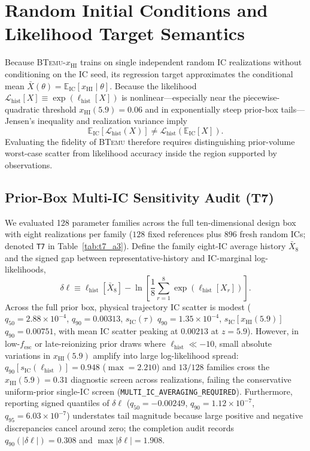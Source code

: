 \documentclass[aps,prd,reprint,superscriptaddress,nofootinbib,amsmath,amssymb,floatfix,longbibliography]{revtex4-2}
\begin{document}
\section{Random Initial Conditions and Likelihood Target Semantics}\label{sec:ic}

Because \textsc{BTemu}-$x_{\mathrm{HI}}$ trains on single independent random IC realizations without conditioning on the IC seed, its regression target approximates the conditional mean $\bar{X}(\theta) = \mathbb{E}_{\mathrm{IC}}[x_{\mathrm{HI}} \mid \theta]$. Because the likelihood $\mathcal{L}_{\mathrm{hist}}[X] \equiv \exp(\ell_{\mathrm{hist}}[X])$ is nonlinear---especially near the piecewise-quadratic threshold $x_{\mathrm{HI}}(5.9)=0.06$ and in exponentially steep prior-box tails---Jensen's inequality and realization variance imply
\begin{equation}
\mathbb{E}_{\mathrm{IC}}\!\left[\mathcal{L}_{\mathrm{hist}}(X)\right]
\neq \mathcal{L}_{\mathrm{hist}}\!\left(\mathbb{E}_{\mathrm{IC}}[X]\right).
\label{eq:jensen}
\end{equation}
Evaluating the fidelity of \textsc{BTemu} therefore requires distinguishing prior-volume worst-case scatter from likelihood accuracy inside the region supported by observations.

\subsection{Prior-Box Multi-IC Sensitivity Audit (T7)}\label{sec:t7}

We evaluated 128 parameter families across the full ten-dimensional design box with eight realizations per family ($128$ fixed references plus $896$ fresh random ICs; denoted \texttt{T7} in Table~\ref{tab:t7_a3}). Define the family eight-IC average history $\bar{X}_8$ and the signed gap between representative-history and IC-marginal log-likelihoods,
\begin{equation}
\delta\ell \equiv \ell_{\mathrm{hist}}[\bar{X}_8] - \ln\!\left[\frac{1}{8}\sum_{r=1}^8 \exp\left(\ell_{\mathrm{hist}}[X_r]\right)\right].
\label{eq:deltal}
\end{equation}
Across the full prior box, physical trajectory IC scatter is modest ($q_{50}=2.88\times 10^{-4}$, $q_{90}=0.00313$, $s_{\mathrm{IC}}(\tau)$ $q_{90}=1.35\times 10^{-4}$, $s_{\mathrm{IC}}[x_{\mathrm{HI}}(5.9)]$ $q_{90}=0.00751$, with mean IC scatter peaking at $0.00213$ at $z=5.9$). However, in low-$f_{\mathrm{esc}}$ or late-reionizing prior draws where $\ell_{\mathrm{hist}} \ll -10$, small absolute variations in $x_{\mathrm{HI}}(5.9)$ amplify into large log-likelihood spread: $q_{90}[s_{\mathrm{IC}}(\ell_{\mathrm{hist}})] = 0.948$ ($\max = 2.210$) and $13/128$ families cross the $x_{\mathrm{HI}}(5.9)=0.31$ diagnostic screen across realizations, failing the conservative uniform-prior single-IC screen (\texttt{MULTI\_IC\_AVERAGING\_REQUIRED}). Furthermore, reporting signed quantiles of $\delta\ell$ ($q_{50}=-0.00249$, $q_{90}=1.12\times 10^{-7}$, $q_{95}=6.03\times 10^{-7}$) understates tail magnitude because large positive and negative discrepancies cancel around zero; the completion audit records $q_{90}(|\delta\ell|) = 0.308$ and $\max |\delta\ell| = 1.908$.
\end{document}
